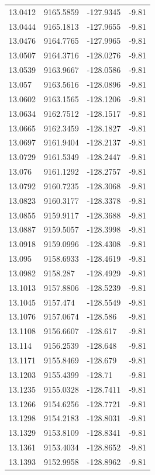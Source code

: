 \begin{table}[H]
\begin{tabular}{llll}
13.0412 & 9165.5859 & -127.9345 & -9.81 \\
13.0444 & 9165.1813 & -127.9655 & -9.81 \\
13.0476 & 9164.7765 & -127.9965 & -9.81 \\
13.0507 & 9164.3716 & -128.0276 & -9.81 \\
13.0539 & 9163.9667 & -128.0586 & -9.81 \\
13.057 & 9163.5616 & -128.0896 & -9.81 \\
13.0602 & 9163.1565 & -128.1206 & -9.81 \\
13.0634 & 9162.7512 & -128.1517 & -9.81 \\
13.0665 & 9162.3459 & -128.1827 & -9.81 \\
13.0697 & 9161.9404 & -128.2137 & -9.81 \\
13.0729 & 9161.5349 & -128.2447 & -9.81 \\
13.076 & 9161.1292 & -128.2757 & -9.81 \\
13.0792 & 9160.7235 & -128.3068 & -9.81 \\
13.0823 & 9160.3177 & -128.3378 & -9.81 \\
13.0855 & 9159.9117 & -128.3688 & -9.81 \\
13.0887 & 9159.5057 & -128.3998 & -9.81 \\
13.0918 & 9159.0996 & -128.4308 & -9.81 \\
13.095 & 9158.6933 & -128.4619 & -9.81 \\
13.0982 & 9158.287 & -128.4929 & -9.81 \\
13.1013 & 9157.8806 & -128.5239 & -9.81 \\
13.1045 & 9157.474 & -128.5549 & -9.81 \\
13.1076 & 9157.0674 & -128.586 & -9.81 \\
13.1108 & 9156.6607 & -128.617 & -9.81 \\
13.114 & 9156.2539 & -128.648 & -9.81 \\
13.1171 & 9155.8469 & -128.679 & -9.81 \\
13.1203 & 9155.4399 & -128.71 & -9.81 \\
13.1235 & 9155.0328 & -128.7411 & -9.81 \\
13.1266 & 9154.6256 & -128.7721 & -9.81 \\
13.1298 & 9154.2183 & -128.8031 & -9.81 \\
13.1329 & 9153.8109 & -128.8341 & -9.81 \\
13.1361 & 9153.4034 & -128.8652 & -9.81 \\
13.1393 & 9152.9958 & -128.8962 & -9.81 \\

\end{tabular}
\end{table}
